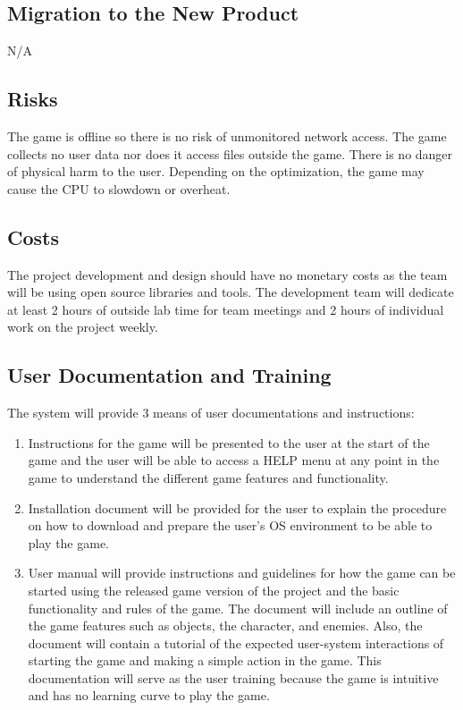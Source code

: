 \documentclass[12pt, titlepage]{article}
\begin{document}
\subsection{Migration to the New Product}
N/A
\subsection{Risks}

The game is offline so there is no risk of unmonitored network access. The game collects no user data nor does it access files outside the game. There is no danger of physical harm to the user. Depending on the optimization, the game may cause the CPU to slowdown or overheat.

\subsection{Costs}

The project development and design should have no monetary costs as the team will be using open source libraries and tools. The development team will dedicate at least 2 hours of outside lab time for team meetings and 2 hours of individual work on the project weekly.

\subsection{User Documentation and Training}

The system will provide 3 means of user documentations and instructions:
\begin{enumerate}
    \item Instructions for the game will be presented to the user at the start of the game and the user will be able to access a HELP menu at any point in the game to understand the different game features and functionality.
    \item Installation document will be provided for the user to explain the procedure on how to download and prepare the user's OS environment to be able to play the game. 
    \item User manual will provide instructions and guidelines for how the game can be started using the released game version of the project and the basic functionality and rules of the game. The document will include an outline of the game features such as objects, the character, and enemies. Also, the document will contain a tutorial of the expected user-system interactions of starting the game and making a simple action in the game. This documentation will serve as the user training because the game is intuitive and has no learning curve to play the game.  
\end{enumerate}
\end{document}

